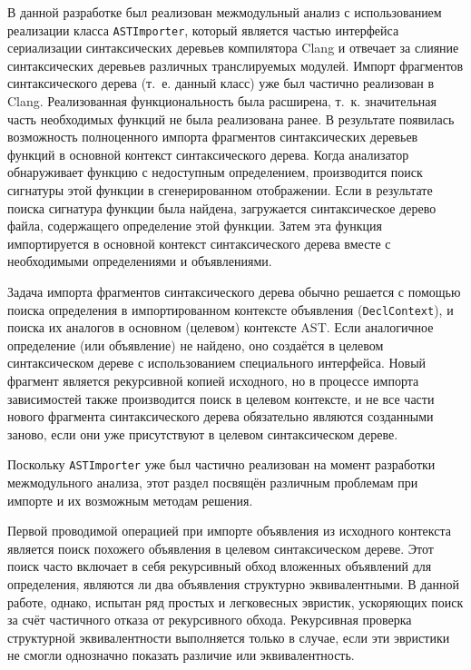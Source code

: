 В данной разработке был реализован межмодульный анализ с использованием реализации класса \texttt{ASTImporter}, который является частью интерфейса сериализации синтаксических деревьев компилятора Clang и отвечает за слияние синтаксических деревьев различных транслируемых модулей. Импорт фрагментов синтаксического дерева (т.~е. данный класс) уже был частично реализован в Clang. Реализованная функциональность была расширена, т.~к. значительная часть необходимых функций не была реализована ранее. В результате появилась возможность полноценного импорта фрагментов синтаксических деревьев функций в основной контекст синтаксического дерева. Когда анализатор обнаруживает функцию с недоступным определением, производится поиск сигнатуры этой функции в сгенерированном отображении. Если в результате поиска сигнатура функции была найдена, загружается синтаксическое дерево файла, содержащего определение этой функции. Затем эта функция импортируется в основной контекст синтаксического дерева вместе с необходимыми определениями и объявлениями.

Задача импорта фрагментов синтаксического дерева обычно решается с помощью поиска определения в импортированном контексте объявления (\texttt{DeclContext}), и поиска их аналогов в основном (целевом) контексте AST. Если аналогичное определение (или объявление) не найдено, оно создаётся в целевом синтаксическом дереве с использованием специального интерфейса. Новый фрагмент является рекурсивной копией исходного, но в процессе импорта зависимостей также производится поиск в целевом контексте, и не все части нового фрагмента синтаксического дерева обязательно являются созданными заново, если они уже присутствуют в целевом синтаксическом дереве.

Поскольку \texttt{ASTImporter} уже был частично реализован на момент разработки межмодульного анализа, этот раздел посвящён различным проблемам при импорте и их возможным методам решения.

Первой проводимой операцией при импорте объявления из исходного контекста является поиск похожего объявления в целевом синтаксическом дереве. Этот поиск часто включает в себя рекурсивный обход вложенных объявлений для определения, являются ли два объявления структурно эквивалентными. В данной работе, однако, испытан ряд простых и легковесных эвристик, ускоряющих поиск за счёт частичного отказа от рекурсивного обхода. Рекурсивная проверка структурной эквивалентности выполняется только в случае, если эти эвристики не смогли однозначно показать различие или эквивалентность.

